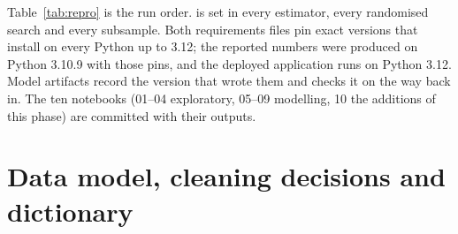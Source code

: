 Table~\ref{tab:repro} is the run order.  is set in every
estimator, every randomised search and every subsample. Both requirements files
pin exact versions that install on every Python up to 3.12; the reported numbers
were produced on Python 3.10.9 with those pins, and the deployed application runs
on Python 3.12. Model artifacts record the
 version that wrote them and 
checks it on the way back in. The ten notebooks (01--04 exploratory, 05--09
modelling, 10 the additions of this phase) are committed with their outputs.

\section{Data model, cleaning decisions and dictionary}
\label{app:dictionary}

